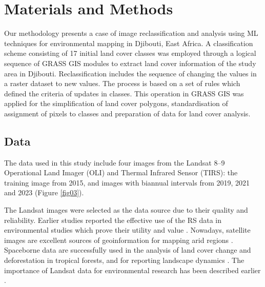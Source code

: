 \documentclass[jimaging,article,accept,pdftex,moreauthors]{Definitions/mdpi}
\begin{document}
\section{Materials and Methods %
}\label{sec3}
Our methodology presents a case of image reclassification and analysis using {ML} techniques{ }for environmental mapping in Djibouti, East Africa. A classification scheme consisting of 17 initial land cover classes was employed through a logical sequence of GRASS GIS modules to extract land cover information of the study area in Djibouti. {Reclassification includes the sequence of changing the values in a raster dataset to new values. The process is based on a set of rules which defined the criteria of updates in classes. This operation in GRASS GIS was applied for the simplification of land cover polygons, standardisation of assignment of pixels to classes and preparation of data for land cover analysis.}

\subsection{Data}

The data used in this study include {four images from the }Landsat 8--9  Operational Land Imager (OLI) and Thermal Infrared Sensor (TIRS): {the training image from 2015, {and images with biannual intervals from }2019, 2021 and 2023 (Figure \ref{fig03}). }%



The {Landsat} images were selected as the data source due to {their} quality and {reliability}\cite{GONG2024149,ALLU2025127478,CHANUWANWIJESINGHE2024112681}. {Earlier studies reported the effective} use of {the} RS data {in environmental studies which prove their utility and value }\cite{WANG2023311,DAREM2023341,FAROOQ2024101168,AFUYE2024103262,CHUGHTAI2021100482,VELASTEGUIMONTOYA2023100659,FARHAN2024103689}. {Nowadays}, satellite images are {excellent} sources of {geoinformation} {for mapping} arid regions \cite{AMAZIRH2023104586,FERCHICHI2024122211,MEKONNEN20251}. {Spaceborne data are successfully} used {in} the analysis of land cover change and deforestation in tropical forests, and{ for reporting }landscape {dynamics} \cite{PARRAPAITAN2024103796,ZHAO2024506,NZABARINDA2025114849,MONTEROBOTEY2024e03068}. {The} importance of Landsat {data} for environmental {research} has been described earlier \cite{AKSOY20221072,NESARI2024101989,KUMAR2022100578}.
\end{document}
